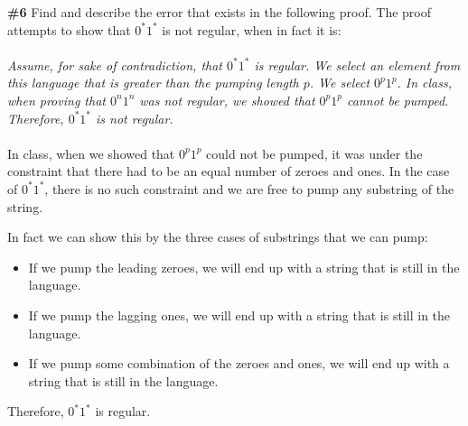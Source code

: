 \documentclass{article}
\newcommand{\problem}[1]{\textbf{\##1}}
\begin{document}
\pagebreak

\problem{6} Find and describe the error that exists in the following proof. The proof attempts to show that $0^*1^*$ is not regular, when in fact it is:
\\
\\
\emph{
Assume, for sake of contradiction, that $0^*1^*$ is regular. We select an element from this language that is greater than the pumping length $p$. We select $0^p1^p$. In class, when proving that $0^n1^n$ was not regular, we showed that $0^p1^p$ cannot be pumped. Therefore, $0^*1^*$ is not regular.
}
\\
\\
In class, when we showed that $0^p1^p$ could not be pumped, it was under the constraint that there had to be an equal number of zeroes and ones. In the case of $0^*1^*$, there is no such constraint and we are free to pump any substring of the string.

In fact we can show this by the three cases of substrings that we can pump:

\begin{itemize}
    \item If we pump the leading zeroes, we will end up with a string that is still in the language.
    \item If we pump the lagging ones, we will end up with a string that is still in the language.
    \item If we pump some combination of the zeroes and ones, we will end up with a string that is still in the language.
\end{itemize}

Therefore, $0^*1^*$ is regular.
\end{document}
